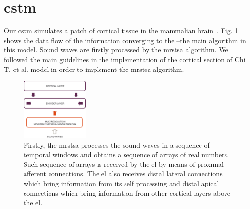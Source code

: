 \documentclass[11pt,a4paper]{article}
\begin{document}
\section{\gls{cstm}}


Our \gls{cstm} simulates a patch of cortical tissue in the mammalian brain~\cite{dematties2018}. Fig. \ref{fig:DataFlow} shows the data flow of the information converging to the --the main algorithm in this model. Sound waves are firstly processed by the \gls{mrstsa} algorithm. We followed the main guidelines in the implementation of the cortical section of Chi T. et al. \cite{chi_2005} model in order to implement the \gls{mrstsa} algorithm.

\begin{figure}[h!]
    \centering
    \includegraphics[width=0.3\textwidth]{DataFlow.png}
    \caption{Firstly, the \gls{mrstsa} processes the sound waves in a sequence of temporal windows and obtains a sequence of arrays of real numbers. Such sequence of arrays is received by the \gls{el} by means of proximal afferent connections. The \gls{el} also receives distal lateral connections which bring information from its self processing and distal apical connections which bring information from other cortical layers above the \gls{el}.}
    \label{fig:DataFlow}
\end{figure}


\end{document}
